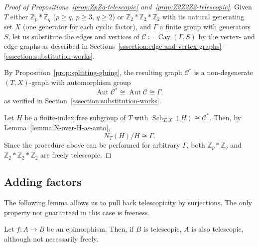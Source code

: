 \documentclass[ALCO,ThmDefs,Unicode,epreuves]{cedram}
\newcommand{\ZZ}{\mathbb{Z}}
\newcommand{\cC}{\mathcal{C}}
\DeclareMathOperator{\Sch}{Sch}
\DeclareMathOperator{\Cay}{Cay}
\DeclareMathOperator{\aut}{Aut}
\begin{document}
\begin{proof}[Proof of Propositions~\ref{prop:ZpZq-telescopic} and~\ref{prop:Z2Z2Z2-telescopic}] Given $T$ either $\ZZ_p*\ZZ_q$ ($p \geq q$, $p\geq 3$, $q\geq 2$) or $\ZZ_2*\ZZ_2*\ZZ_2$ with its natural generating set $X$ (one generator for each cyclic factor), and ${\Gamma}$ a finite group with generators $S$, let us substitute the edges and vertices of $\cC \coloneqq \Cay({\Gamma},S)$ by the vertex- and edge-graphs as described in Sections~\ref{sssection:edge-and-vertex-graphs}--\ref{sssection:substitution-works}. 

By Proposition~\ref{prop:splitting-gluing}, the resulting graph $\cC^*$ is a non-degenerate $(T,X)$-graph with automorphism group
\[
\aut \cC^* \cong \aut \cC \cong {\Gamma},
\]
as verified in Section~\ref{sssection:substitution-works}. 
 
Let $H$ be a finite-index free subgroup of $T$ with $\Sch_{T,X}(H) \cong \cC^*$. Then, by Lemma~\ref{lemma:N-over-H-as-auto},
\[
N_T(H)/H \cong \Gamma.
\]
Since the procedure above can be performed for arbitrary ${\Gamma}$, both $\ZZ_p*\ZZ_q$ and $\ZZ_2*\ZZ_2*\ZZ_2$ are freely telescopic.
\end{proof}


\subsection{Adding factors}\label{section:addingfactors}


The following lemma allows us to pull back telescopicity by surjections. The only property not guaranteed in this case is freeness.

\begin{lemm}\label{lemma:surjection-telescopic}
Let $ f : A \longrightarrow B$ be an epimorphism. Then, if $B$ is telescopic, $A$ is also telescopic, although not necessarily freely.
\end{lemm}
\end{document}
